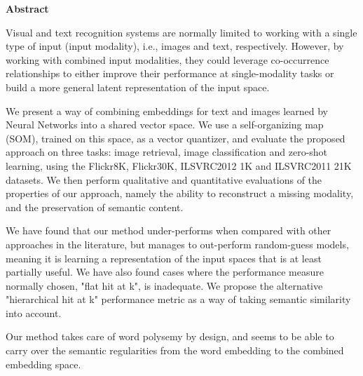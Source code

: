 \documentclass[a4paper]{standalone}
\begin{document}
\thispagestyle{empty}
\vspace*{1.0cm}

\begin{center}
    \textbf{Abstract}
\end{center}

\vspace*{0.5cm}

\noindent
Visual and text recognition systems are normally limited to working with a single type of input (input modality), i.e., images and text, respectively. However, by working with combined input modalities, they could leverage co-occurrence relationships to either improve their performance at single-modality tasks or build a more general latent representation of the input space.

We present a way of combining embeddings for text and images learned by Neural Networks into a shared vector space.
We use a self-organizing map (SOM), trained on this space, as a vector quantizer, and evaluate the proposed approach on three tasks: image retrieval, image classification and zero-shot learning, using the Flickr8K, Flickr30K, ILSVRC2012 1K and ILSVRC2011 21K  datasets.
We then perform qualitative and quantitative evaluations of the properties of our approach, namely the ability to reconstruct a missing modality, and the preservation of semantic content.

We have found that our method under-performs when compared with other approaches in the literature, but manages to out-perform random-guess models, meaning it is learning a representation of the input spaces that is at least partially useful. We have also found cases where the performance measure normally chosen, "flat hit at k", is inadequate. We propose the alternative "hierarchical hit at k" performance metric as a way of taking semantic similarity into account.

Our method takes care of word polysemy by design, and seems to be able to carry over the semantic regularities from the word embedding to the combined embedding space.
\end{document}
